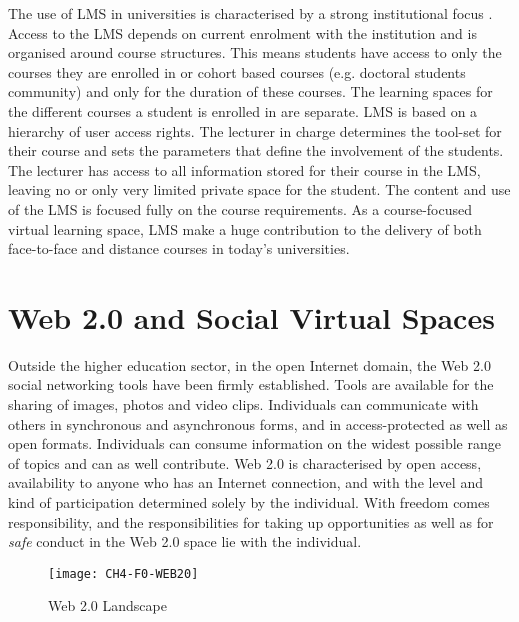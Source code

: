 The use of LMS in universities is characterised by a strong institutional focus
\citep{Siemens2004}. Access to the LMS depends on current enrolment with the
institution and is organised around course structures. This means students have
access to only the courses they are enrolled in or cohort based courses (e.g.
doctoral students community) and only for the duration of these courses. The
learning spaces for the different courses a student is enrolled in are separate.
LMS is based on a hierarchy of user access rights. The lecturer in charge
determines the tool-set for their course and sets the parameters that define the
involvement of the students. The lecturer has access to all information stored
for their course in the LMS, leaving no or only very limited private space for
the student. The content and use of the LMS is focused fully on the course
requirements. As a course-focused virtual learning space, LMS make a huge
contribution to the delivery of both face-to-face and distance courses in
today's universities.

\section{Web 2.0 and Social Virtual Spaces}
Outside the higher education sector, in the open Internet domain, the Web 2.0
social networking tools have been firmly established. Tools are available for
the sharing of images, photos and video clips. Individuals can communicate with
others in synchronous and asynchronous forms, and in access-protected as well as
open formats. Individuals can consume information on the widest possible range
of topics and can as well contribute. Web 2.0 is characterised by open access,
availability to anyone who has an Internet connection, and with the level and
kind of participation determined solely by the individual. With freedom comes
responsibility, and the responsibilities for taking up opportunities as well as
for \textit{safe} conduct in the Web 2.0 space lie with the individual.

\begin{figure}[htb]
\centering
\texttt{[image: CH4-F0-WEB20]}
\caption[Web 2.0 Landscape]{Web 2.0 Landscape \citep{Dawson2007}}
\label{fig:web20l}
\end{figure}

